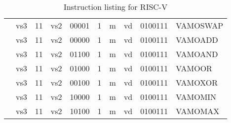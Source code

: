 \begin{table}[p]
\begin{small}
\begin{center}
\begin{tabular}{p{0in}p{0.4in}p{0.1in}p{0.3in}p{0.5in}p{0.5in}p{0.1in}p{0.3in}p{0.5in}p{0.7in}l}
&
\multicolumn{2}{|c|}{vs3} &
\multicolumn{1}{c|}{11} &
\multicolumn{1}{c|}{vs2} &
\multicolumn{1}{c|}{00001} &
\multicolumn{1}{c|}{1} &
\multicolumn{1}{c|}{m} &
\multicolumn{1}{c|}{vd} &
\multicolumn{1}{c|}{0100111} & VAMOSWAP \\
\cline{2-10}
  

&
\multicolumn{2}{|c|}{vs3} &
\multicolumn{1}{c|}{11} &
\multicolumn{1}{c|}{vs2} &
\multicolumn{1}{c|}{00000} &
\multicolumn{1}{c|}{1} &
\multicolumn{1}{c|}{m} &
\multicolumn{1}{c|}{vd} &
\multicolumn{1}{c|}{0100111} & VAMOADD \\
\cline{2-10}
  

&
\multicolumn{2}{|c|}{vs3} &
\multicolumn{1}{c|}{11} &
\multicolumn{1}{c|}{vs2} &
\multicolumn{1}{c|}{01100} &
\multicolumn{1}{c|}{1} &
\multicolumn{1}{c|}{m} &
\multicolumn{1}{c|}{vd} &
\multicolumn{1}{c|}{0100111} & VAMOAND \\
\cline{2-10}
  

&
\multicolumn{2}{|c|}{vs3} &
\multicolumn{1}{c|}{11} &
\multicolumn{1}{c|}{vs2} &
\multicolumn{1}{c|}{01000} &
\multicolumn{1}{c|}{1} &
\multicolumn{1}{c|}{m} &
\multicolumn{1}{c|}{vd} &
\multicolumn{1}{c|}{0100111} & VAMOOR \\
\cline{2-10}
  

&
\multicolumn{2}{|c|}{vs3} &
\multicolumn{1}{c|}{11} &
\multicolumn{1}{c|}{vs2} &
\multicolumn{1}{c|}{00100} &
\multicolumn{1}{c|}{1} &
\multicolumn{1}{c|}{m} &
\multicolumn{1}{c|}{vd} &
\multicolumn{1}{c|}{0100111} & VAMOXOR \\
\cline{2-10}
  

&
\multicolumn{2}{|c|}{vs3} &
\multicolumn{1}{c|}{11} &
\multicolumn{1}{c|}{vs2} &
\multicolumn{1}{c|}{10000} &
\multicolumn{1}{c|}{1} &
\multicolumn{1}{c|}{m} &
\multicolumn{1}{c|}{vd} &
\multicolumn{1}{c|}{0100111} & VAMOMIN \\
\cline{2-10}
  

&
\multicolumn{2}{|c|}{vs3} &
\multicolumn{1}{c|}{11} &
\multicolumn{1}{c|}{vs2} &
\multicolumn{1}{c|}{10100} &
\multicolumn{1}{c|}{1} &
\multicolumn{1}{c|}{m} &
\multicolumn{1}{c|}{vd} &
\multicolumn{1}{c|}{0100111} & VAMOMAX \\
\cline{2-10}
  

\end{tabular}
\end{center}
\end{small}
\caption{Instruction listing for RISC-V}
\label{instr-table}
\end{table}
  

